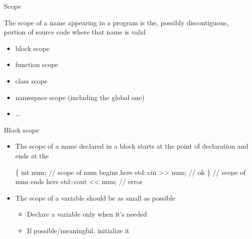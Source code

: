 \begin{frame}{Scope}

  The scope of a name appearing in a program is the, possibly
  discontiguous, portion of source code where that name is valid

  \begin{itemize}
  \item block scope
  \item function scope
  \item class scope
  \item namespace scope (including the global one)
  \item \ldots
  \end{itemize}

\end{frame}

\begin{frame}[fragile]{Block scope}

  \begin{itemize}[<+->]
  \item The scope of a name declared in a block starts at the point of
    declaration and ends at the \code{\}}

    \begin{codeblock}
\{
  \ddd
  int num;         // scope of num begins here
  std::cin >{}> num; // ok
\}                  // scope of num ends here
std::cout <{}< num;  // error\end{codeblock}

  \item<2-> The scope of a variable should be as small as possible
    \begin{itemize}
    \item Declare a variable only when it's needed
    \item If possible/meaningful, initialize it
    \end{itemize}
  \end{itemize}

\end{frame}

